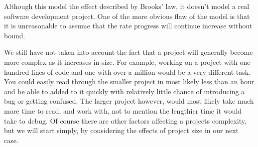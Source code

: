 \documentclass{article}
\newenvironment{atomize}
    {\begin{list} {} {
            \setlength\itemindent{0pt}
            \setlength\leftmargin{10pt}
            \setlength\labelwidth{0pt}
    }}
    {\end{list}}
\begin{document}
\begin{atomize}
\begin{atomize}
          Although this model the effect described by Brooks' law, it doesn't
          model a real software development project. One of the more obvious
          flaw of the model is that it is unreasonable to assume that the rate
          progress will continue increase without bound.
                    
          We still have not taken into account the fact that a project will
          generally become more complex as it increases in size. For example,
          working on a project with one hundred lines of code and one with over
          a million would be a very different task. You could easily read
          through the smaller project in most likely less than an hour and be
          able to added to it quickly with relatively little chance of
          introducing a bug or getting confused. The larger project however,
          would most likely take much more time to read, and work with, not to
          mention the lengthier time it would take to debug. Of course there 
          are other factors affecting a projects complexity, but we will start
          simply, by considering the effects of project size in our next case.
      \end{atomize}

  \end{atomize}

  \pagebreak
\end{document}
